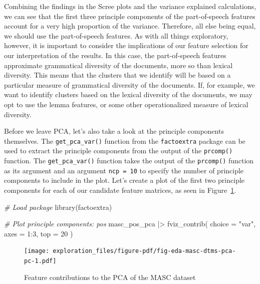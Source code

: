 \documentclass[
  letterpaper,
  DIV=11,
  numbers=noendperiod]{scrreport}
\newenvironment{Shaded}{\begin{snugshade}}{\end{snugshade}}
\newcommand{\AttributeTok}[1]{\textcolor[rgb]{0.00,0.00,0.00}{#1}}
\newcommand{\CommentTok}[1]{\textcolor[rgb]{0.00,0.00,0.00}{\textit{#1}}}
\newcommand{\DecValTok}[1]{\textcolor[rgb]{0.00,0.00,0.00}{#1}}
\newcommand{\FunctionTok}[1]{\textcolor[rgb]{0.00,0.00,0.00}{#1}}
\newcommand{\NormalTok}[1]{\textcolor[rgb]{0.00,0.00,0.00}{#1}}
\newcommand{\SpecialCharTok}[1]{\textcolor[rgb]{0.00,0.00,0.00}{#1}}
\newcommand{\StringTok}[1]{\textcolor[rgb]{0.00,0.00,0.00}{#1}}
\theoremstyle{definition}
\theoremstyle{remark}
\begin{document}
Combining the findings in the Scree plots and the variance explained
calculations, we can see that the first three principle components of
the part-of-speech features account for a very high proportion of the
variance. Therefore, all else being equal, we should use the
part-of-speech features. As with all things exploratory, however, it is
important to consider the implications of our feature selection for our
interpretation of the results. In this case, the part-of-speech features
approximate grammatical diversity of the documents, more so than lexical
diversity. This means that the clusters that we identify will be based
on a particular measure of grammatical diversity of the documents. If,
for example, we want to identify clusters based on the lexical diversity
of the documents, we may opt to use the lemma features, or some other
operationalized measure of lexical diversity.

Before we leave PCA, let's also take a look at the principle components
themselves. The \texttt{get\_pca\_var()} function from the
\texttt{factoextra} package can be used to extract the principle
components from the output of the \texttt{prcomp()} function. The
\texttt{get\_pca\_var()} function takes the output of the
\texttt{prcomp()} function as its argument and an argument
\texttt{ncp\ =\ 10} to specify the number of principle components to
include in the plot. Let's create a plot of the first two principle
components for each of our candidate feature matrices, as seen in
Figure~\ref{fig-eda-masc-dtms-pca-pc}.

\begin{Shaded}
\begin{Highlighting}[]
\CommentTok{\# Load package}
\FunctionTok{library}\NormalTok{(factoextra)}

\CommentTok{\# Plot principle components: pos}
\NormalTok{masc\_pos\_pca }\SpecialCharTok{|\textgreater{}}
  \FunctionTok{fviz\_contrib}\NormalTok{(}
    \AttributeTok{choice =} \StringTok{"var"}\NormalTok{,}
    \AttributeTok{axes =} \DecValTok{1}\SpecialCharTok{:}\DecValTok{3}\NormalTok{,}
    \AttributeTok{top =} \DecValTok{20}
\NormalTok{  )}
\end{Highlighting}
\end{Shaded}

\begin{figure}[H]

{\centering \texttt{[image: exploration\_files/figure-pdf/fig-eda-masc-dtms-pca-pc-1.pdf]}

}

\caption{\label{fig-eda-masc-dtms-pca-pc}Feature contributions to the
PCA of the MASC dataset}

\end{figure}
\end{document}
